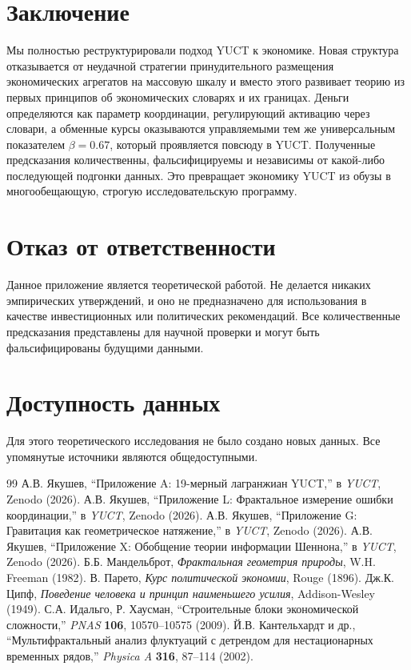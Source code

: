 \documentclass[12pt,a4paper]{article}
\theoremstyle{remark}
\begin{document}
	\section{Заключение}
	
	Мы полностью реструктурировали подход YUCT к экономике. Новая структура отказывается от неудачной стратегии принудительного размещения экономических агрегатов на массовую шкалу и вместо этого развивает теорию из первых принципов об экономических словарях и их границах. Деньги определяются как параметр координации, регулирующий активацию через словари, а обменные курсы оказываются управляемыми тем же универсальным показателем \(\beta = 0.67\), который проявляется повсюду в YUCT. Полученные предсказания количественны, фальсифицируемы и независимы от какой-либо последующей подгонки данных. Это превращает экономику YUCT из обузы в многообещающую, строгую исследовательскую программу.
	
	\section*{Отказ от ответственности}
	
	Данное приложение является теоретической работой. Не делается никаких эмпирических утверждений, и оно не предназначено для использования в качестве инвестиционных или политических рекомендаций. Все количественные предсказания представлены для научной проверки и могут быть фальсифицированы будущими данными.
	
	\section*{Доступность данных}
	
	Для этого теоретического исследования не было создано новых данных. Все упомянутые источники являются общедоступными.
	
	\begin{thebibliography}{99}
		 А.В. Якушев, ``Приложение A: 19-мерный лагранжиан YUCT,'' в \emph{YUCT}, Zenodo (2026).
		 А.В. Якушев, ``Приложение L: Фрактальное измерение ошибки координации,'' в \emph{YUCT}, Zenodo (2026).
		 А.В. Якушев, ``Приложение G: Гравитация как геометрическое натяжение,'' в \emph{YUCT}, Zenodo (2026).
		 А.В. Якушев, ``Приложение X: Обобщение теории информации Шеннона,'' в \emph{YUCT}, Zenodo (2026).
		 Б.Б. Мандельброт, \emph{Фрактальная геометрия природы}, W.H. Freeman (1982).
		 В. Парето, \emph{Курс политической экономии}, Rouge (1896).
		 Дж.К. Ципф, \emph{Поведение человека и принцип наименьшего усилия}, Addison-Wesley (1949).
		 С.А. Идальго, Р. Хаусман, ``Строительные блоки экономической сложности,'' \emph{PNAS} \textbf{106}, 10570–10575 (2009).
		 Й.В. Кантельхардт и др., ``Мультифрактальный анализ флуктуаций с детрендом для нестационарных временных рядов,'' \emph{Physica A} \textbf{316}, 87–114 (2002).
	\end{thebibliography}
	
\end{document}

